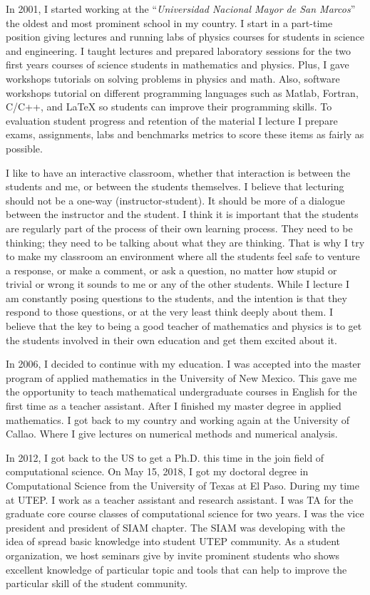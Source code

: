 \documentclass[a4paper, 11pt]{article}
\begin{document}
\begin{small}
In 2001,  I started working at the ``\textit{Universidad Nacional Mayor de San Marcos}'' the oldest and most prominent school in my country.
I start in a part-time position giving lectures and running labs of physics courses for students in science and engineering.
I taught lectures and prepared laboratory sessions for the two first years courses of science students in mathematics and physics.
Plus, I gave workshops tutorials on solving problems in physics and math.
Also, software workshops tutorial on different programming languages such as Matlab, Fortran, C/C++, and \LaTeX\;  so students can improve their programming skills.
To evaluation student progress and retention of the material I lecture I prepare exams, assignments, labs and benchmarks metrics to score these items as fairly as possible.

I like to have an interactive classroom, whether that interaction is between the students and me, or between the students themselves. 
I believe that lecturing should not be a one-way (instructor-student).  It should be more of a dialogue between the instructor and the student.
I think it is important that the students are regularly part of the process of their own learning process. 
They need to be thinking; they need to be talking about what they are thinking.
That is why I try to make my classroom an environment where all the students feel safe to venture a response,
or make a comment, or ask a question, no matter how stupid or trivial or wrong it sounds to me or any of the other students. 
While I lecture I am constantly posing questions to the students, and the intention is that they respond to those questions,
or at the very least think deeply about them. I believe that the key to being a good teacher of mathematics
and physics is to get the students involved in their own education and get them excited about it.

In 2006, I decided to continue with my education. I was accepted into the master program of applied mathematics in the University of New Mexico.
This gave me the opportunity to teach mathematical undergraduate courses in English for the first time as a teacher assistant. 
After I finished my master degree in applied mathematics. I got back to my country and working again at the University of Callao.
Where I give lectures on numerical methods and numerical analysis. 

In 2012, I got back to the US to get a Ph.D. this time in the join field of computational science.
On May 15, 2018, I got my doctoral degree in Computational Science from the University of Texas at El Paso.
During my time at UTEP. I work as a teacher assistant and research assistant.
I was TA for the graduate core course classes of computational science for two years. I was the vice president and president of SIAM chapter.
The SIAM was developing with the idea of spread basic knowledge into student UTEP community.
As a student organization, we host seminars give by invite prominent students who shows excellent knowledge of particular topic and tools that can help to improve the particular skill of the student community.


\end{small}
\end{document}
